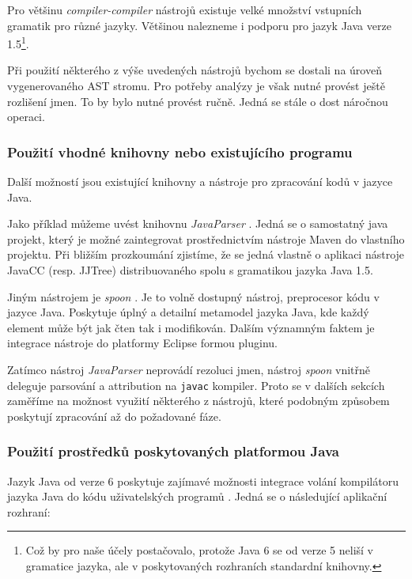 \vspace{0.5cm}

Pro většinu \emph{compiler-compiler} nástrojů existuje velké množství vstupních gramatik pro různé jazyky. Většinou nalezneme i podporu pro jazyk Java verze 1.5\footnote{Což by pro naše účely postačovalo, protože Java 6 se od verze 5 neliší v gramatice jazyka, ale v poskytovaných rozhraních standardní knihovny.}.

Při použití některého z výše uvedených nástrojů bychom se dostali na úroveň vygenerovaného AST stromu. Pro potřeby analýzy je však nutné provést ještě rozlišení jmen. To by bylo nutné provést ručně. Jedná se stále o dost náročnou operaci.

\subsubsection{Použití vhodné knihovny nebo existujícího programu}
Další možností jsou existující knihovny a nástroje pro zpracování kodů v jazyce Java.

Jako příklad můžeme uvést knihovnu \emph{JavaParser} \cite{parsertools:javaparser}. Jedná se o samostatný java projekt, který je možné zaintegrovat prostřednictvím nástroje Maven do vlastního projektu. Při bližším prozkoumání zjistíme, že se jedná vlastně o aplikaci nástroje JavaCC (resp. JJTree) distribuovaného spolu s gramatikou jazyka Java 1.5.

Jiným nástrojem je \emph{spoon} \cite{parsertools:spoon}. Je to volně dostupný nástroj, preprocesor kódu v jazyce Java. Poskytuje úplný a detailní metamodel jazyka Java, kde každý element může být jak čten tak i modifikován. Dalším významným faktem je integrace nástroje do platformy Eclipse formou pluginu.

Zatímco nástroj \emph{JavaParser} neprovádí rezoluci jmen, nástroj \emph{spoon} vnitřně deleguje parsování a attribution na \verb+javac+ kompiler. Proto se v dalších sekcích zaměříme na možnost využití některého z nástrojů, které podobným způsobem poskytují zpracování až do požadované fáze.

\subsubsection{Použití prostředků poskytovaných platformou Java}
Jazyk Java od verze 6 poskytuje zajímavé možnosti integrace volání kompilátoru jazyka Java do kódu uživatelských programů \cite{source_code_analysis_corejavatechtips}. Jedná se o následující aplikační rozhraní:

